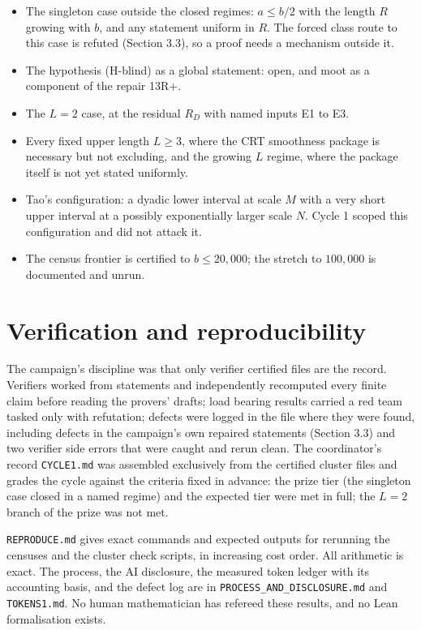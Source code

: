 \documentclass[11pt]{article}
\theoremstyle{remark}
\begin{document}
\begin{itemize}[leftmargin=1.5em]
\item The singleton case outside the closed regimes: $a \le b/2$ with the length $R$ growing with $b$, and any statement uniform in $R$. The forced class route to this case is refuted (Section 3.3), so a proof needs a mechanism outside it.
\item The hypothesis (H-blind) as a global statement: open, and moot as a component of the repair 13R+.
\item The $L = 2$ case, at the residual $R_D$ with named inputs E1 to E3.
\item Every fixed upper length $L \ge 3$, where the CRT smoothness package is necessary but not excluding, and the growing $L$ regime, where the package itself is not yet stated uniformly.
\item Tao's configuration: a dyadic lower interval at scale $M$ with a very short upper interval at a possibly exponentially larger scale $N$. Cycle 1 scoped this configuration and did not attack it.
\item The census frontier is certified to $b \le 20{,}000$; the stretch to $100{,}000$ is documented and unrun.
\end{itemize}

\section{Verification and reproducibility}

The campaign's discipline was that only verifier certified files are the record. Verifiers worked from statements and independently recomputed every finite claim before reading the provers' drafts; load bearing results carried a red team tasked only with refutation; defects were logged in the file where they were found, including defects in the campaign's own repaired statements (Section 3.3) and two verifier side errors that were caught and rerun clean. The coordinator's record \texttt{CYCLE1.md} was assembled exclusively from the certified cluster files and grades the cycle against the criteria fixed in advance: the prize tier (the singleton case closed in a named regime) and the expected tier were met in full; the $L = 2$ branch of the prize was not met.

\texttt{REPRODUCE.md} gives exact commands and expected outputs for rerunning the censuses and the cluster check scripts, in increasing cost order. All arithmetic is exact. The process, the AI disclosure, the measured token ledger with its accounting basis, and the defect log are in \texttt{PROCESS\_AND\_DISCLOSURE.md} and \texttt{TOKENS1.md}. No human mathematician has refereed these results, and no Lean formalisation exists.
\end{document}
